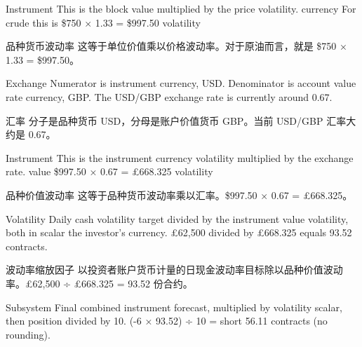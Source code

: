 \bipairgap

\begin{englishblock} Instrument This is the block value multiplied by the price volatility. currency For crude this is \$750 × 1.33 = \$997.50 volatility \end{englishblock}

\begin{chineseblock}品种货币波动率 这等于单位价值乘以价格波动率。对于原油而言，就是 \$750 × 1.33 = \$997.50。 \end{chineseblock}

\bipairgap

\begin{englishblock} Exchange Numerator is instrument currency, USD. Denominator is account value rate currency, GBP. The USD/GBP exchange rate is currently around 0.67. \end{englishblock}

\begin{chineseblock}汇率 分子是品种货币 USD，分母是账户价值货币 GBP。当前 USD/GBP 汇率大约是 0.67。 \end{chineseblock}

\bipairgap

\begin{englishblock} Instrument This is the instrument currency volatility multiplied by the exchange rate. value \$997.50 × 0.67 = £668.325 volatility \end{englishblock}

\begin{chineseblock}品种价值波动率 这等于品种货币波动率乘以汇率。\$997.50 × 0.67 = £668.325。 \end{chineseblock}

\bipairgap

\begin{englishblock} Volatility Daily cash volatility target divided by the instrument value volatility, both in scalar the investor's currency. £62,500 divided by £668.325 equals 93.52 contracts. \end{englishblock}

\begin{chineseblock}波动率缩放因子 以投资者账户货币计量的日现金波动率目标除以品种价值波动率。£62,500 ÷ £668.325 = 93.52 份合约。\end{chineseblock}

\bipairgap

\begin{englishblock} Subsystem Final combined instrument forecast, multiplied by volatility scalar, then position divided by 10. (-6 × 93.52) ÷ 10 = short 56.11 contracts (no rounding). \end{englishblock}

